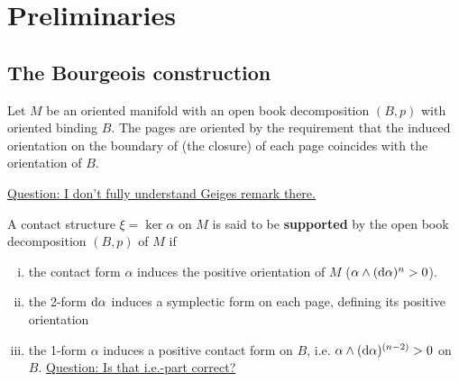 \section*{Preliminaries}
\subsection*{The Bourgeois construction}


\begin{definition}\label{def:support}
    Let $M$ be an oriented manifold with an open book decomposition $(B,p)$ with oriented binding $B$.
    The pages are oriented by the requirement that the induced orientation on the boundary of (the closure) of each page coincides with the orientation of $B$.
    
    \underline{Question: I don't fully understand Geiges remark there.}

    A contact structure $\xi = \ker \alpha$ on $M$ is said to be \textbf{supported} by the open book decomposition $(B,p)$ of $M$ if
    \begin{enumerate}[(i)]
        \item the contact form $\alpha$ induces the positive orientation of $M$ ($\alpha \wedge (\mathrm{d} \alpha)^n > 0$).
        \item the 2-form $\mathrm{d} \alpha$ induces a symplectic form on each page, defining its positive orientation
        \item the 1-form $\alpha$ induces a positive contact form on $B$, i.e. $\alpha \wedge (\mathrm{d} \alpha)^{(n-2)} > 0$ on $B$. \underline{Question: Is that i.e.-part correct?}
    \end{enumerate}
\end{definition}

